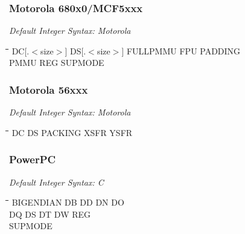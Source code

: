  \subsubsection{Motorola 680x0/MCF5xxx}

{\em Default Integer Syntax: Motorola}

{\tt\begin{tabbing}
\hspace{3cm}\=\hspace{3cm}\=\hspace{3cm}\=\hspace{3cm}\=\kill
DC[.$<$size$>$]\> DS[.$<$size$>$] \> FULLPMMU    \> FPU         \> PADDING \\
PMMU       \> REG         \> SUPMODE \\
\end{tabbing}}

\subsubsection{Motorola 56xxx}

{\em Default Integer Syntax: Motorola}

{\tt\begin{tabbing}
\hspace{3cm}\=\hspace{3cm}\=\hspace{3cm}\=\hspace{3cm}\=\kill
DC         \> DS          \> PACKING     \> XSFR        \> YSFR \\
\end{tabbing}}

\subsubsection{PowerPC}

{\em Default Integer Syntax: C}

{\tt\begin{tabbing}
\hspace{3cm}\=\hspace{3cm}\=\hspace{3cm}\=\hspace{3cm}\=\kill
BIGENDIAN  \> DB          \> DD          \> DN          \> DO \\
DQ         \> DS          \> DT          \> DW          \> REG \\
SUPMODE \\
\end{tabbing}}

